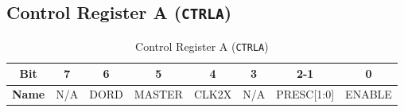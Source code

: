   \subsection{Control Register A (\texttt{CTRLA})}
  \label{sec:ctrla}
  
  \begin{table}[H]
      \centering
      \caption{Control Register A (\texttt{CTRLA})}
      \begin{tabular}{@{}cccccccc@{}}
          \toprule
          \textbf{Bit} & 7 & 6 & 5 & 4 & 3 & 2-1 & 0 \\ \midrule
          \textbf{Name} & N/A & DORD & MASTER & CLK2X & N/A & PRESC[1:0] & ENABLE \\ \bottomrule
      \end{tabular}
      \label{tab:ctrl_a}
  \end{table}
  
